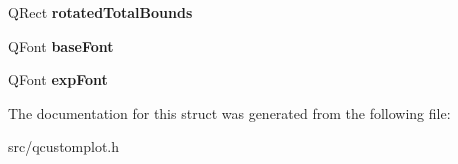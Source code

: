 \begin{DoxyCompactItemize}
\item 
Q\+Rect {\bfseries rotated\+Total\+Bounds}\hypertarget{structQCPAxisPainterPrivate_1_1TickLabelData_aa4d38c5ea47c9184a78ee33ae7f1012e}{}\label{structQCPAxisPainterPrivate_1_1TickLabelData_aa4d38c5ea47c9184a78ee33ae7f1012e}

\item 
Q\+Font {\bfseries base\+Font}\hypertarget{structQCPAxisPainterPrivate_1_1TickLabelData_a0d4958a706debaa8d19a9b65fc090d56}{}\label{structQCPAxisPainterPrivate_1_1TickLabelData_a0d4958a706debaa8d19a9b65fc090d56}

\item 
Q\+Font {\bfseries exp\+Font}\hypertarget{structQCPAxisPainterPrivate_1_1TickLabelData_adc10767ebcb719d6927c012a38b9d933}{}\label{structQCPAxisPainterPrivate_1_1TickLabelData_adc10767ebcb719d6927c012a38b9d933}

\end{DoxyCompactItemize}


The documentation for this struct was generated from the following file\+:\begin{DoxyCompactItemize}
\item 
src/qcustomplot.\+h\end{DoxyCompactItemize}
